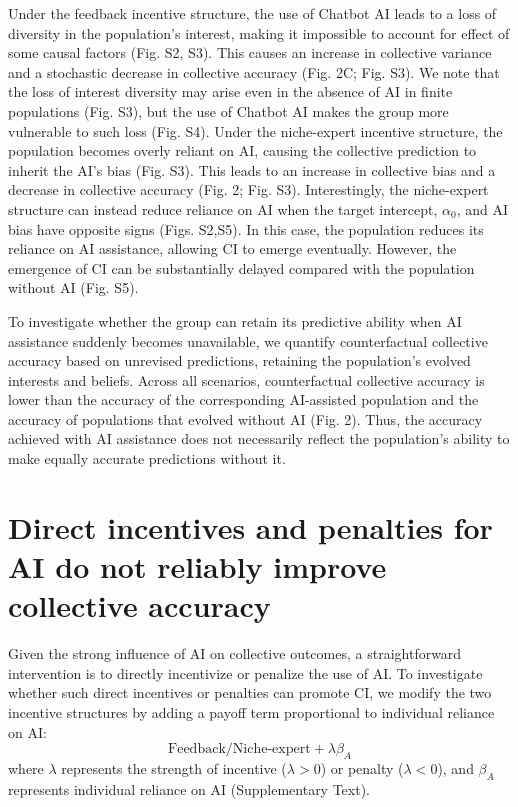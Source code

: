 \documentclass[12pt]{article}
\begin{document}
Under the feedback incentive structure, the use of Chatbot AI leads to a loss of diversity in the population's interest, making it impossible to account for effect of some causal factors (Fig. S2, S3).
This causes an increase in collective variance and a stochastic decrease in collective accuracy (Fig. 2C; Fig. S3).
We note that the loss of interest diversity may arise even in the absence of AI in finite populations (Fig. S3), but the use of Chatbot AI makes the group more vulnerable to such loss (Fig. S4).
Under the niche-expert incentive structure, the population becomes overly reliant on AI, causing the collective prediction to inherit the AI's bias (Fig. S3).
This leads to an increase in collective bias and a decrease in collective accuracy (Fig. 2; Fig. S3).
Interestingly, the niche-expert structure can instead reduce reliance on AI when the target intercept, $\alpha_0$, and AI bias have opposite signs (Figs. S2,S5).
In this case, the population reduces its reliance on AI assistance, allowing CI to emerge eventually. 
However, the emergence of CI can be substantially delayed compared with the population without AI (Fig. S5).

To investigate whether the group can retain its predictive ability when AI assistance suddenly becomes unavailable, we quantify counterfactual collective accuracy based on unrevised predictions, retaining the population's evolved interests and beliefs. 
Across all scenarios, counterfactual collective accuracy is lower than the accuracy of the corresponding AI-assisted population and the accuracy of populations that evolved without AI (Fig. 2).
Thus, the accuracy achieved with AI assistance does not necessarily reflect the population's ability to make equally accurate predictions without it.

\section*{Direct incentives and penalties for AI do not reliably improve collective accuracy}

Given the strong influence of AI on collective outcomes, a straightforward intervention is to directly incentivize or penalize the use of AI. 
To investigate whether such direct incentives or penalties can promote CI, we modify the two incentive structures by adding a payoff term proportional to individual reliance on AI:
\begin{equation}
\mathrm{Feedback /} \textrm{Niche-expert} + \lambda \beta_A
\end{equation}
where $\lambda$ represents the strength of incentive ($\lambda > 0$) or penalty ($\lambda < 0$), and $\beta_A$ represents individual reliance on AI (Supplementary Text).
\end{document}
